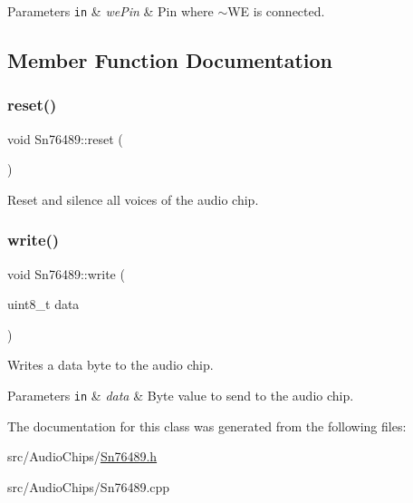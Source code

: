 \begin{DoxyParams}[1]{Parameters}
\mbox{\tt in}  & {\em we\+Pin} & Pin where $\sim$\+WE is connected. \\
\hline
\end{DoxyParams}


\subsection{Member Function Documentation}
\mbox{\label{classSn76489_a904bb7ddb48bb425181bcdae443c49fb}} 
\subsubsection{\texorpdfstring{reset()}{reset()}}
{\footnotesize\ttfamily void Sn76489\+::reset (\begin{DoxyParamCaption}{ }\end{DoxyParamCaption})}

Reset and silence all voices of the audio chip. \mbox{\label{classSn76489_a5add4d0735cd8edbd03eb1c54bd09532}} 
\subsubsection{\texorpdfstring{write()}{write()}}
{\footnotesize\ttfamily void Sn76489\+::write (\begin{DoxyParamCaption}\item[{uint8\+\_\+t}]{data }\end{DoxyParamCaption})}

Writes a data byte to the audio chip.


\begin{DoxyParams}[1]{Parameters}
\mbox{\tt in}  & {\em data} & Byte value to send to the audio chip. \\
\hline
\end{DoxyParams}


The documentation for this class was generated from the following files\+:\begin{DoxyCompactItemize}
\item 
src/\+Audio\+Chips/\mbox{\hyperlink{Sn76489_8h}{Sn76489.\+h}}\item 
src/\+Audio\+Chips/Sn76489.\+cpp\end{DoxyCompactItemize}
